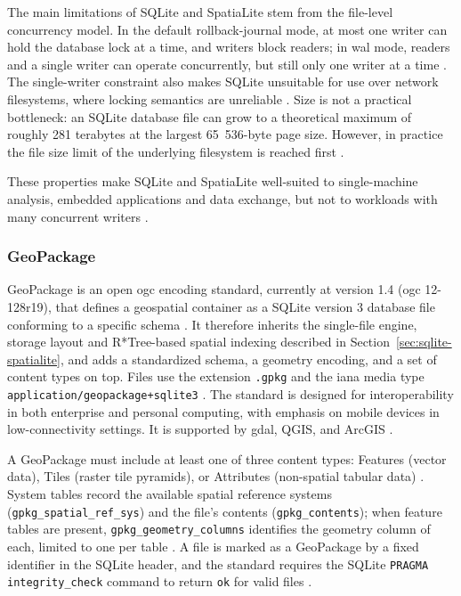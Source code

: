 The main limitations of SQLite and SpatiaLite stem from the file-level concurrency model. In the default rollback-journal mode, at most one writer can hold the database lock at a time, and writers block readers; in \acrshort{wal} mode, readers and a single writer can operate concurrently, but still only one writer at a time \parencite{sqlite2024_wal}. The single-writer constraint also makes SQLite unsuitable for use over network filesystems, where locking semantics are unreliable \parencite{sqlite2024_appropriate_uses}. Size is not a practical bottleneck: an SQLite database file can grow to a theoretical maximum of roughly 281 terabytes at the largest 65~536-byte page size. However, in practice the file size limit of the underlying filesystem is reached first \parencite{sqlite2024_limits}.

These properties make SQLite and SpatiaLite well-suited to single-machine analysis, embedded applications and data exchange, but not to workloads with many concurrent writers \parencite{sqlite2024_appropriate_uses}.

\subsubsection{GeoPackage}
\label{sec:geopackage}
GeoPackage is an open \acrshort{ogc} encoding standard, currently at version 1.4 (\acrshort{ogc} 12-128r19), that defines a geospatial container as a SQLite version 3 database file conforming to a specific schema \parencite{ogc2024_geopackage_encoding_standard_140}. It therefore inherits the single-file engine, storage layout and R*Tree-based spatial indexing described in Section~\ref{sec:sqlite-spatialite}, and adds a standardized schema, a geometry encoding, and a set of content types on top. Files use the extension \texttt{.gpkg} and the \acrshort{iana} media type \texttt{application/geopackage+sqlite3} \parencite{ogc2024_geopackage_encoding_standard_140}. The standard is designed for interoperability in both enterprise and personal computing, with emphasis on mobile devices in low-connectivity settings. It is supported by \acrshort{gdal}, QGIS, and ArcGIS \parencite{ogc2024_geopackage_encoding_standard_140}.

A GeoPackage must include at least one of three content types: Features (vector data), Tiles (raster tile pyramids), or Attributes (non-spatial tabular data) \parencite{ogc2024_geopackage_encoding_standard_140}. System tables record the available spatial reference systems (\texttt{gpkg\_spatial\_ref\_sys}) and the file's contents (\texttt{gpkg\_contents}); when feature tables are present, \texttt{gpkg\_geometry\_columns} identifies the geometry column of each, limited to one per table \parencite{ogc2024_geopackage_encoding_standard_140}. A file is marked as a GeoPackage by a fixed identifier in the SQLite header, and the standard requires the SQLite \texttt{PRAGMA integrity\_check} command to return \texttt{ok} for valid files \parencite{ogc2024_geopackage_encoding_standard_140}.


